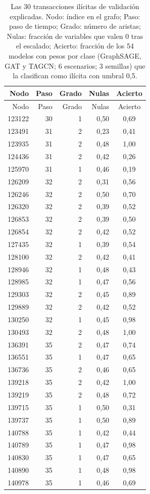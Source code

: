 \begin{longtable}{rrrrc}
\caption{Las 30 transacciones ilícitas de validación explicadas. Nodo: índice en el grafo; Paso: paso de tiempo; Grado: número de aristas; Nulas: fracción de variables que valen 0 tras el escalado; Acierto: fracción de los 54 modelos con pesos por clase (GraphSAGE, GAT y TAGCN; 6 escenarios; 3 semillas) que la clasifican como ilícita con umbral 0,5.}\label{tab:nodos}\\
\toprule
Nodo & Paso & Grado & Nulas & Acierto \\
\midrule
\endfirsthead
\toprule
Nodo & Paso & Grado & Nulas & Acierto \\
\midrule
\endhead
123122 & 30 & 1 & 0{,}50 & 0{,}69 \\
123491 & 31 & 2 & 0{,}23 & 0{,}41 \\
123935 & 31 & 2 & 0{,}48 & 1{,}00 \\
124436 & 31 & 2 & 0{,}42 & 0{,}26 \\
125970 & 31 & 1 & 0{,}46 & 0{,}19 \\
126209 & 32 & 2 & 0{,}31 & 0{,}56 \\
126246 & 32 & 2 & 0{,}50 & 0{,}70 \\
126320 & 32 & 2 & 0{,}39 & 0{,}52 \\
126853 & 32 & 2 & 0{,}39 & 0{,}50 \\
126854 & 32 & 2 & 0{,}42 & 0{,}52 \\
127435 & 32 & 1 & 0{,}39 & 0{,}54 \\
128100 & 32 & 2 & 0{,}42 & 0{,}41 \\
128946 & 32 & 1 & 0{,}48 & 0{,}43 \\
128985 & 32 & 1 & 0{,}47 & 0{,}56 \\
129303 & 32 & 2 & 0{,}45 & 0{,}89 \\
129889 & 32 & 2 & 0{,}42 & 0{,}52 \\
130250 & 32 & 1 & 0{,}45 & 0{,}98 \\
130493 & 32 & 2 & 0{,}48 & 1{,}00 \\
136391 & 35 & 2 & 0{,}47 & 0{,}74 \\
136551 & 35 & 1 & 0{,}47 & 0{,}65 \\
136736 & 35 & 2 & 0{,}46 & 0{,}65 \\
139218 & 35 & 2 & 0{,}42 & 1{,}00 \\
139219 & 35 & 2 & 0{,}48 & 0{,}72 \\
139715 & 35 & 1 & 0{,}50 & 0{,}31 \\
139737 & 35 & 1 & 0{,}50 & 0{,}89 \\
140788 & 35 & 1 & 0{,}42 & 0{,}44 \\
140789 & 35 & 1 & 0{,}47 & 0{,}98 \\
140830 & 35 & 1 & 0{,}47 & 0{,}65 \\
140890 & 35 & 1 & 0{,}48 & 0{,}98 \\
140978 & 35 & 1 & 0{,}46 & 0{,}69 \\
\bottomrule
\end{longtable}
